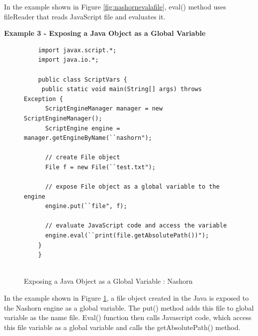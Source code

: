 In the example shown in Figure \ref{fig:nashornevalafile}, eval() method uses fileReader that reads JavaScript file and evaluates it.

\textbf{Example 3 - Exposing a Java Object as a Global Variable}

\begin{figure}[ht]
	\begin{lstlisting}
	import javax.script.*;
	import java.io.*;
	
	public class ScriptVars {
	 public static void main(String[] args) throws Exception {
	  ScriptEngineManager manager = new ScriptEngineManager();
	  ScriptEngine engine = manager.getEngineByName(``nashorn");
	
	  // create File object
	  File f = new File(``test.txt");
	
	  // expose File object as a global variable to the engine
	  engine.put(``file", f);
	
	  // evaluate JavaScript code and access the variable
	  engine.eval(``print(file.getAbsolutePath())");
	}
	}
	
	\end{lstlisting}
	\caption{Exposing a Java Object as a Global Variable : Nashorn}
	\label{fig:nashornevalaobject}
\end{figure}



In the example shown in Figure \ref{fig:nashornevalaobject}, a file object created in the Java is exposed to the Nashorn engine as a global variable. The put() method adds this file to global variable as the name file. Eval() function then calls Javascript code, which access this file variable as a global variable and calls the getAbsolutePath() method.